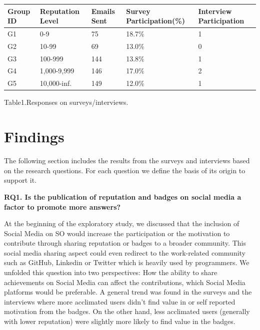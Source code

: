 \documentclass{sigchi}
\begin{document}
\begin{center}
    \begin{tabular}{ | p{1.0cm} | p{1.6cm} | P{0.9cm} | P{1.8cm} | P{1.4cm} |}
    \hline
    \textbf{Group ID} & \textbf{Reputation Level} & \textbf{Emails Sent} & \textbf{Survey Participation(\%)} & \textbf{Interview Participation } \\ \hline
    G1 & 0-9 & 75 & 18.7\% & 1 \\ \hline
    G2 & 10-99 & 69 & 13.0\% & 0 \\ \hline
    G3 & 100-999 & 144 & 13.8\% & 1 \\ \hline
    G4 & 1,000-9,999 & 146 & 17.0\% & 2 \\ \hline
    G5 & 10,000-inf. & 149 & 12.0\% & 1 \\ \hline
  \end{tabular}
  \bigskip
   Table1.Responses on surveys/interviews.
\end{center}

\section{Findings}

The following section includes the results from the surveys and interviews based on the research questions. For each question we define the basis of its origin to support it.

\textbf{RQ1. Is the publication of reputation and badges on social media a factor to promote more answers?}

At the beginning of the exploratory study, we discussed that the inclusion of Social Media on SO would increase the participation or the motivation to contribute through sharing reputation or badges to a broader community. This social media sharing aspect could even redirect to the work-related community such as GitHub, Linkedin or Twitter which is heavily used by programmers. We unfolded this question into two perspectives: How the ability to share achievements on Social Media can affect the contributions,  which Social Media platforms would be preferable. A general trend was found in the surveys and the interviews where more acclimated users didn't find value in or self reported motivation from the badges. On the other hand, less acclimated users (generally with lower reputation) were slightly more likely to find value in the badges.
\end{document}
